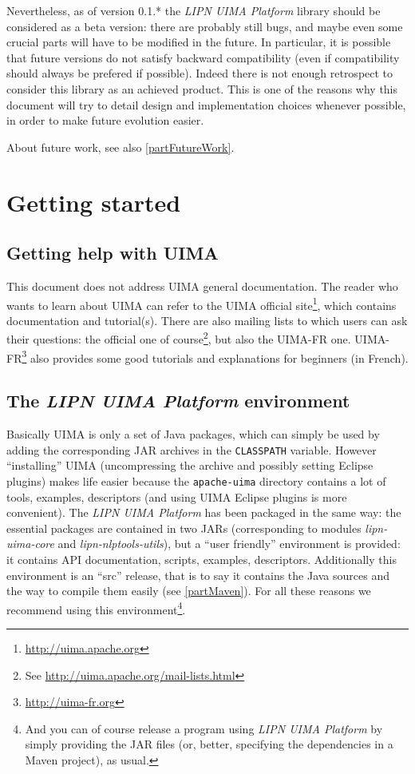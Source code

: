 \documentclass{article}
\newcommand{\softName}{{\em LIPN UIMA Platform}\xspace}
\newcommand{\uimaModule}{{\em lipn-uima-core}\xspace}
\newcommand{\utilsModule}{{\em lipn-nlptools-utils}\xspace}
\begin{document}
Nevertheless, as of version 0.1.*  the \softName library should be considered as a beta version: there are probably still bugs, and maybe even some crucial parts will have to be modified in the future. In particular, it is possible that future versions  do not satisfy backward compatibility (even if compatibility should always be prefered if possible). Indeed there is not enough retrospect to consider this library as an achieved product. This is one of the reasons why this document will try to detail design and implementation choices whenever possible, in order to make future evolution easier. 


About future work, see also \ref{partFutureWork}.







\section{Getting started}



\subsection{Getting help with UIMA}
\label{partUimaHelp}
This document does not address UIMA general documentation. The reader who wants to learn about UIMA can refer to the UIMA official site\footnote{\url{http://uima.apache.org}}, which contains documentation and tutorial(s). There are also mailing lists to which users can ask their questions: the official one of course\footnote{See \url{http://uima.apache.org/mail-lists.html}}, but also the UIMA-FR one. UIMA-FR\footnote{\url{http://uima-fr.org}} also provides some good tutorials and explanations for beginners (in French).

\subsection{The \softName environment}
\label{partEnvironment}

Basically UIMA is only a set of Java packages, which can simply be used by adding the corresponding JAR archives in the {\tt CLASSPATH} variable. However ``installing'' UIMA (uncompressing the archive and possibly setting Eclipse plugins) makes life easier because the {\tt apache-uima} directory contains a lot of tools, examples, descriptors (and using UIMA Eclipse plugins is more convenient). The \softName has been packaged in the same way: the essential packages are contained in two JARs (corresponding to modules \uimaModule and \utilsModule), but a ``user friendly'' environment is provided: it contains API documentation, scripts, examples, descriptors. Additionally this environment is an ``src'' release, that is to say it contains the Java sources and the way to compile them easily (see \ref{partMaven}). For all these reasons we recommend using this environment\footnote{And you can of course release a program using \softName by simply providing the JAR files (or, better, specifying the dependencies in a Maven project), as usual.}.
\end{document}
